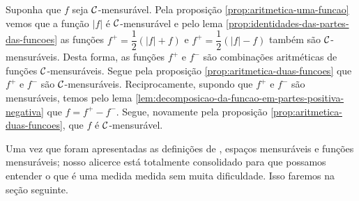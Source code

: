     \begin{prova}
        Suponha que $f$ seja $\operatorname{\mathcal{C}}$-mensurável.
        Pela proposição \ref{prop:aritmetica-uma-funcao} vemos que a função $|f|$ é $\operatorname{\mathcal{C}}$-mensurável e pelo lema \ref{prop:identidades-das-partes-das-funcoes} as funções $f^+ = \dfrac{1}{2}(|f| + f)$ e $f^+ = \dfrac{1}{2}(|f| - f)$ também são $\operatorname{\mathcal{C}}$-mensuráveis.
        Desta forma, as funções $f^+$ e $f^-$ são combinações aritméticas de funções $\operatorname{\mathcal{C}}$-mensuráveis.
        Segue pela proposição \ref{prop:aritmetica-duas-funcoes} que $f^+$ e $f^-$ são $\operatorname{\mathcal{C}}$-mensuráveis.
        Reciprocamente, supondo que $f^+$ e $f^-$ são mensuráveis, temos pelo lema \ref{lem:decomposicao-da-funcao-em-partes-positiva-negativa} que
        $f = f^+ - f^-$. Segue, novamente pela proposição \ref{prop:aritmetica-duas-funcoes}, que $f$ é $\operatorname{\mathcal{C}}$-mensurável. 
    \end{prova}

Uma vez que foram apresentadas as definições de \sigal, espaços mensuráveis e funções mensuráveis; nosso alicerce está totalmente consolidado para que possamos entender o que é uma medida medida sem muita dificuldade.
Isso faremos na seção seguinte.
